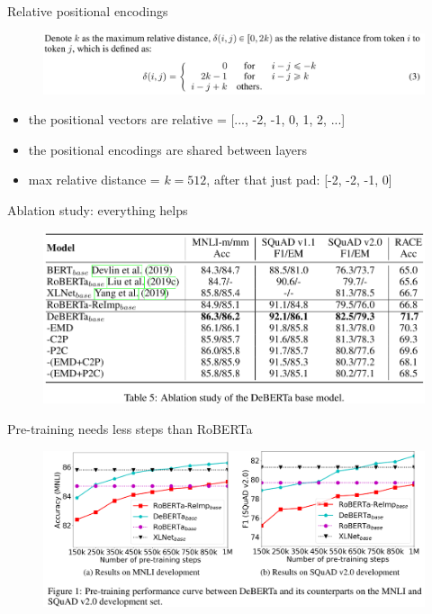 \documentclass{beamer}
\begin{document}
\begin{frame}{Relative positional encodings}
 
\begin{figure}[h]
\includegraphics[width=\textwidth]{img/reldist}
\end{figure}

\begin{itemize}
\item the positional vectors are relative = [..., -2, -1, 0, 1, 2, ...]
\item the positional encodings are shared between layers
\item max relative distance = $k=512$, after that just pad: [-2, -2, -1, 0]
\end{itemize}

\end{frame}
\begin{frame}{Ablation study: everything helps}

\begin{figure}[h]
\includegraphics[width=\textwidth]{img/ablation}
\end{figure}

\end{frame}
\begin{frame}{Pre-training needs less steps than RoBERTa}

\begin{figure}[h]
\includegraphics[width=\textwidth]{img/pretraining}
\end{figure}

\end{frame}
\end{document}
